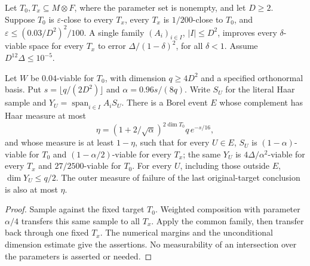 \begin{theorem}
    \label{thm:half_sampling_uniform_image_event}
    \leanok
    Let $T_0,T_x\subseteq M\otimes F$, where the parameter set is nonempty,
    and let $D\ge2$. Suppose $T_0$ is $\varepsilon$-close to every $T_x$,
    every $T_x$ is $1/200$-close to $T_0$, and
    $\varepsilon\le(0.03/D^2)^2/100$. A single family $(A_i)_{i\in I}$,
    $|I|\le D^2$, improves every $\delta$-viable space for every $T_x$ to
    error $\Delta/(1-\delta)^2$, for all $\delta<1$.
    Assume $D^{12}\Delta\le10^{-5}$.

    Let $W$ be $0.04$-viable for $T_0$, with dimension $q\ge4D^2$ and a
    specified orthonormal basis. Put
    $s=\lfloor q/(2D^2)\rfloor$ and $\alpha=0.96s/(8q)$.
    Write $S_U$ for the literal Haar sample and
    $Y_U=\operatorname{span}_{i\in I}A_iS_U$.
    There is a Borel event $E$ whose complement has Haar measure at most
    \[
        \eta=(1+2/\sqrt\alpha)^{2\dim T_0}q\,e^{-s/16},
    \]
    and whose measure is at least $1-\eta$, such that for every $U\in E$,
    $S_U$ is $(1-\alpha)$-viable for $T_0$ and
    $(1-\alpha/2)$-viable for every $T_x$; the same $Y_U$ is
    $4\Delta/\alpha^2$-viable for every $T_x$ and $27/2500$-viable for $T_0$.
    For every $U$, including those outside $E$, $\dim Y_U\le q/2$.
    The outer measure of failure of the last original-target conclusion
    is also at most $\eta$.
\end{theorem}
\begin{proof}\leanok
    Sample against the fixed target $T_0$. Weighted composition with
    parameter $\alpha/4$ transfers this same sample to all $T_x$.
    Apply the common family, then transfer back through one fixed $T_x$.
    The numerical margins and the unconditional dimension estimate give
    the assertions. No measurability of an intersection over the parameters
    is asserted or needed.
\end{proof}

